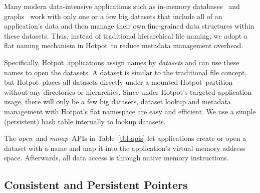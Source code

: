 \documentclass[sigconf]{acmart}
\renewcommand{\em}{\it}
\newcommand{\open}{\textit{open}}
\newcommand{\mmap}{\textit{mmap}}
\newcommand{\dsnvm}{DSPM}
\newcommand{\hotpot}{Hotpot}
\newcommand{\cd}{CD}
\providecommand{\DIFaddbegin}{} %
\providecommand{\DIFaddend}{} %
\providecommand{\DIFdelbegin}{} %
\providecommand{\DIFdelend}{} %
\begin{document}
{Many modern data-intensive applications such as in-memory databases~\cite{MongoDB} and graphs~\cite{Gonzalez14-OSDI,Gonzalez12-OSDI}
work with only one or a few big datasets that include all of an application's data 
and then manage their own fine-grained data structures within these datasets.
Thus, instead of traditional hierarchical file naming, 
we adopt a flat naming mechanism in \hotpot\ to reduce metadata management overhead. %

Specifically, \hotpot\ applications assign names by {\em datasets}
and can use these names to open the datasets.
A dataset is similar to the traditional file concept, 
but \hotpot\ places all datasets directly under a mounted \hotpot\ partition without any directories or hierarchies.
Since under \hotpot's targeted application usage, there will only be a few big datasets,
dataset lookup and metadata management with \hotpot's flat namespace are easy and efficient.
We use a simple (persistent) hash table internally to lookup datasets. 

The \open\ and \mmap\ APIs in Table~\ref{tbl-apis} let applications create or open a dataset with a name and 
map it into the application's virtual memory address space.
Afterwards, all data access is through native memory instructions.

\DIFdelbegin %
\DIFdelend \DIFaddbegin \subsection{Consistent and Persistent Pointers} 
\DIFaddend \label{sec:addressing}
\DIFdelbegin %
\DIFdelend 

}
\end{document}
